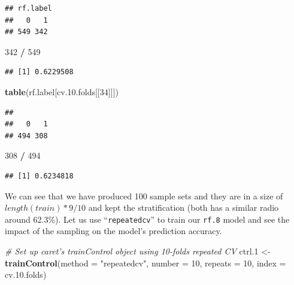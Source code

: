 \documentclass[
]{book}
\newenvironment{Shaded}{\begin{snugshade}}{\end{snugshade}}
\newcommand{\CommentTok}[1]{\textcolor[rgb]{0.56,0.35,0.01}{\textit{#1}}}
\newcommand{\DataTypeTok}[1]{\textcolor[rgb]{0.13,0.29,0.53}{#1}}
\newcommand{\DecValTok}[1]{\textcolor[rgb]{0.00,0.00,0.81}{#1}}
\newcommand{\FloatTok}[1]{\textcolor[rgb]{0.00,0.00,0.81}{#1}}
\newcommand{\KeywordTok}[1]{\textcolor[rgb]{0.13,0.29,0.53}{\textbf{#1}}}
\newcommand{\NormalTok}[1]{#1}
\newcommand{\OperatorTok}[1]{\textcolor[rgb]{0.81,0.36,0.00}{\textbf{#1}}}
\newcommand{\StringTok}[1]{\textcolor[rgb]{0.31,0.60,0.02}{#1}}
\begin{document}
\begin{verbatim}
## rf.label
##   0   1 
## 549 342
\end{verbatim}

\begin{Shaded}
\begin{Highlighting}[]
\DecValTok{342} \OperatorTok{/}\StringTok{ }\DecValTok{549}
\end{Highlighting}
\end{Shaded}

\begin{verbatim}
## [1] 0.6229508
\end{verbatim}

\begin{Shaded}
\begin{Highlighting}[]
\KeywordTok{table}\NormalTok{(rf.label[cv.}\FloatTok{10.}\NormalTok{folds[[}\DecValTok{34}\NormalTok{]]])}
\end{Highlighting}
\end{Shaded}

\begin{verbatim}
## 
##   0   1 
## 494 308
\end{verbatim}

\begin{Shaded}
\begin{Highlighting}[]
\DecValTok{308} \OperatorTok{/}\StringTok{ }\DecValTok{494}
\end{Highlighting}
\end{Shaded}

\begin{verbatim}
## [1] 0.6234818
\end{verbatim}

We can see that we have produced 100 sample sets and they are in a size of \(length(train)*9/10\) and kept the stratification (both has a similar radio around 62.3\%). Let us use ``\texttt{repeatedcv}'' to train our \texttt{rf.8} model and see the impact of the sampling on the model's prediction accuracy.

\begin{Shaded}
\begin{Highlighting}[]
\CommentTok{# Set up caret's trainControl object using 10-folds repeated CV}
\NormalTok{ctrl}\FloatTok{.1}\NormalTok{ <-}\StringTok{ }\KeywordTok{trainControl}\NormalTok{(}\DataTypeTok{method =} \StringTok{"repeatedcv"}\NormalTok{, }\DataTypeTok{number =} \DecValTok{10}\NormalTok{, }\DataTypeTok{repeats =} \DecValTok{10}\NormalTok{, }\DataTypeTok{index =}\NormalTok{ cv.}\FloatTok{10.}\NormalTok{folds)}
\end{Highlighting}
\end{Shaded}
\end{document}
